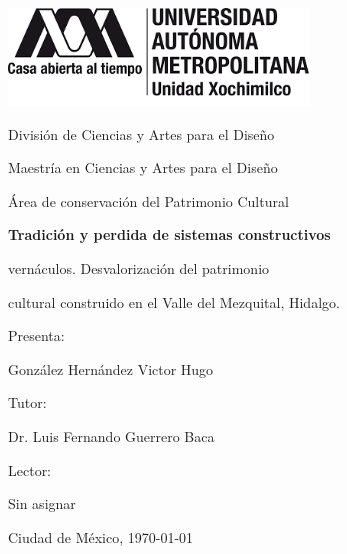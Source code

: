 \begin{titlepage}

	{\includegraphics[width=0.6\textwidth]{./imagenes/logo_uam/logo_completo.png}\par}
	\vspace{0.5cm}
	{\large División de Ciencias y Artes para el Diseño\par}
	{\small Maestría en Ciencias y Artes para el Diseño\par}
	{\small Área de conservación del Patrimonio Cultural\par}
	\vspace{1.5cm}
	{\bfseries \Large Tradición y perdida de sistemas constructivos\par vernáculos. Desvalorización del patrimonio\par cultural construido en el Valle del Mezquital, Hidalgo.\par}
	\vspace{1.5cm}
	{\small Presenta:\par}
	{González Hernández Victor Hugo\par}
	{\small Tutor:\par}
	{Dr. Luis Fernando Guerrero Baca\par}
	{\small Lector:\par}
	{Sin asignar\par}
	\vspace{1cm}
	{\small Ciudad de México, \today \par}

\end{titlepage}
